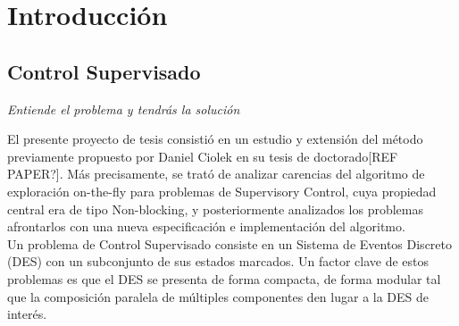\documentclass[11pt,a4paper,twoside]{tesis}
\begin{document}

\def\autor{Matias Duran, Florencia Zanollo}
\def\tituloTesis{TESIS\\Directed Controller Synthesis for \\ Non-Maximal Blocking 
	Requirements}
\def\runtitulo{Sintesis de Controladores Dirigida}
\def\runtitle{Directed Controller Synthesis}
\def\director{Sebasit\'an Uchitel}
\def\codirector{???}
\def\lugar{Buenos Aires, 2020}


\frontmatter
\pagestyle{empty}


\cleardoublepage

\cleardoublepage

\cleardoublepage

\cleardoublepage
\tableofcontents

\mainmatter
\pagestyle{headings}




\chapter{Introducción}
\section{Control Supervisado}
{\begin{small}%
\begin{flushright}%
\it
Entiende el problema y tendrás la solución
\end{flushright}%
\end{small}%
\vspace{.5cm}}
El presente proyecto de tesis consistió en un estudio y extensión del método previamente propuesto por Daniel Ciolek en su tesis de doctorado[REF PAPER?]. Más precisamente, se trató de analizar carencias del algoritmo de exploración on-the-fly para problemas de Supervisory Control, cuya propiedad central era de tipo Non-blocking, y posteriormente analizados los problemas afrontarlos con una nueva especificación e implementación del algoritmo.
\\
Un problema de Control Supervisado consiste en un Sistema de Eventos Discreto (DES) con un subconjunto de sus estados marcados. Un factor clave de estos problemas es que el DES se presenta de forma compacta, de forma modular tal que la composición paralela de múltiples componentes den lugar a la DES de interés.
\\
\end{document}
